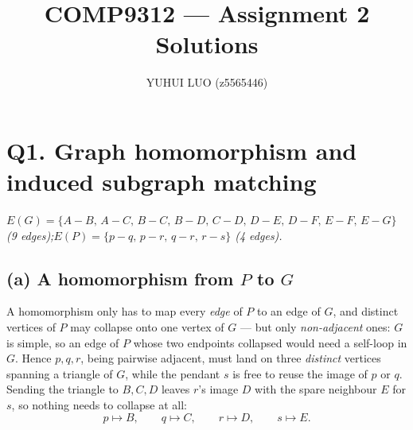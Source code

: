 \documentclass[11pt]{article}
\title{\vspace{-1.2em}\textbf{COMP9312 --- Assignment 2 Solutions}}
\author{YUHUI LUO \quad (z5565446)}
\date{}
\newcommand{\figdata}[1]{%
  \par\vspace{-0.6em}%
  {\centering\small\textit{#1}\par}%
  \vspace{0.4em}}
\begin{document}
\maketitle
\thispagestyle{fancy}

\section*{Q1. Graph homomorphism and induced subgraph matching}

\begin{center}
\end{center}
\figdata{$E(G)=\{A{-}B,\,A{-}C,\,B{-}C,\,B{-}D,\,C{-}D,\,D{-}E,\,D{-}F,\,E{-}F,\,E{-}G\}$
\quad(9 edges);\qquad $E(P)=\{p{-}q,\,p{-}r,\,q{-}r,\,r{-}s\}$ \quad(4 edges).}

\subsection*{(a) A homomorphism from $P$ to $G$}

A homomorphism only has to map every \emph{edge} of $P$ to an edge of $G$, and distinct
vertices of $P$ may collapse onto one vertex of $G$ --- but only \emph{non-adjacent} ones:
$G$ is simple, so an edge of $P$ whose two endpoints collapsed would need a self-loop in
$G$. Hence $p,q,r$, being pairwise adjacent, must land on three \emph{distinct} vertices
spanning a triangle of $G$, while the pendant $s$ is free to reuse the image of $p$ or $q$.
Sending the triangle to $B,C,D$ leaves $r$'s image $D$ with the spare neighbour $E$ for
$s$, so nothing needs to collapse at all:
\[
  p\mapsto B,\qquad q\mapsto C,\qquad r\mapsto D,\qquad s\mapsto E .
\]
\end{document}
